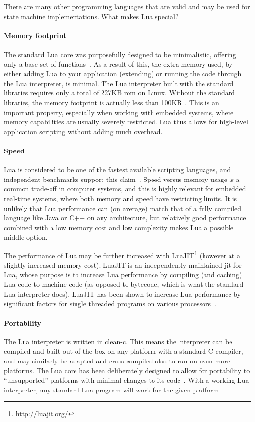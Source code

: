 There are many other programming languages that are valid and may be used for state machine implementations. What makes Lua special?

\paragraph{Memory footprint}
The standard Lua core was purposefully designed to be minimalistic, offering only a base set of functions~\cite{article:the_implementation_of_lua}. As a result of this, the extra memory used, by either adding Lua to your application (extending) or running the code through the Lua interpreter, is minimal. The Lua interpreter built with the standard libraries requires only a total of 227KB \gls{rom} on Linux. Without the standard libraries, the memory footprint is actually less than 100KB~\cite{website:lua_about}. This is an important property, especially when working with embedded systems, where memory capabilities are usually severely restricted. Lua thus allows for high-level application scripting without adding much overhead.

\paragraph{Speed}
Lua is considered to be one of the fastest available scripting languages, and independent benchmarks support this claim~\cite{website:computer_language_benchmarks_game}. Speed versus memory usage is a common trade-off in computer systems, and this is highly relevant for embedded real-time systems, where both memory and speed have restricting limits. It is unlikely that Lua performance can (on average) match that of a fully compiled language like Java or C++ on any architecture, but relatively good performance combined with a low memory cost and low complexity makes Lua a possible middle-option.

The performance of Lua may be further increased with LuaJIT\footnote{http://luajit.org/} (however at a slightly increased memory cost). LuaJIT is an independently maintained \gls{jit} for Lua, whose purpose is to increase Lua performance by compiling (and caching) Lua code to machine code (as opposed to bytecode, which is what the standard Lua interpreter does). LuaJIT has been shown to increase Lua performance by significant factors for single threaded programs on various processors~\cite{website:luajit_performance}. 

\paragraph{Portability}
The Lua interpreter is written in \gls{clean-c}. This means the interpreter can be compiled and built out-of-the-box on any platform with a standard C compiler, and may similarly be adapted and cross-compiled also to run on even more platforms. The Lua core has been deliberately designed to allow for portability to ``unsupported'' platforms with minimal changes to its code~\cite{chapter:porting_lua_microcontroller}. With a working Lua interpreter, any standard Lua program will work for the given platform.

